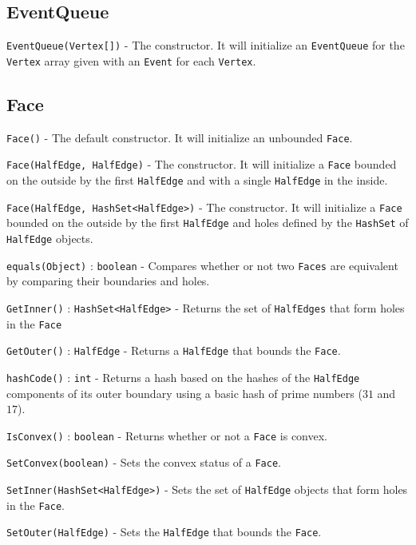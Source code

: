 \documentclass[11pt]{article}
\begin{document}
\subsection{EventQueue}
\label{sec:eventqueue}

	\texttt{EventQueue(Vertex[])} - The constructor. It will initialize an \texttt{EventQueue} for the \texttt{Vertex} array given with an \texttt{Event} for each \texttt{Vertex}.

\subsection{Face}
\label{sec:face}

	\texttt{Face()} - The default constructor. It will initialize an unbounded \texttt{Face}.
	
	\texttt{Face(HalfEdge, HalfEdge)} - The constructor. It will initialize a \texttt{Face} bounded on the outside by the first \texttt{HalfEdge} and with a single \texttt{HalfEdge} in the inside.
	
	\texttt{Face(HalfEdge, HashSet<HalfEdge>)} - The constructor. It will initialize a \texttt{Face} bounded on the outside by the first \texttt{HalfEdge} and holes defined by the \texttt{HashSet} of \texttt{HalfEdge} objects.
	
	\texttt{equals(Object)} : \texttt{boolean} - Compares whether or not two \texttt{Faces} are equivalent by comparing their boundaries and holes.
	
	\texttt{GetInner()} : \texttt{HashSet<HalfEdge>} - Returns the set of \texttt{HalfEdges} that form holes in the \texttt{Face}
	
	\texttt{GetOuter()} : \texttt{HalfEdge} - Returns a \texttt{HalfEdge} that bounds the \texttt{Face}.
	
	\texttt{hashCode()} : \texttt{int} - Returns a hash based on the hashes of the \texttt{HalfEdge} components of its outer boundary using a basic hash of prime numbers ($31$ and $17$).
	
	\texttt{IsConvex()} : \texttt{boolean} - Returns whether or not a \texttt{Face} is convex.
	
	\texttt{SetConvex(boolean)} - Sets the convex status of a \texttt{Face}.
	
	\texttt{SetInner(HashSet<HalfEdge>)} - Sets the set of \texttt{HalfEdge} objects that form holes in the \texttt{Face}.
	
	\texttt{SetOuter(HalfEdge)} - Sets the \texttt{HalfEdge} that bounds the \texttt{Face}.
	
\end{document}
